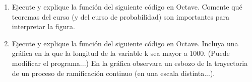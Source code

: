 \begin{problema}
\mbox{}
\begin{enumerate}
\item Ejecute y explique la funci\'on del siguiente c\'odigo en Octave. Comente qu\'e teoremas del curso (y del curso de probabilidad) son importantes para interpretar la figura.

\item Ejecute y explique la funci\'on del siguiente c\'odigo en Octave. Incluya una gr\'afica en la que la longitud de la variable k sea mayor a 1000. (Puede modificar el programa...) En la gr\'afica observara un esbozo de la trayectoria de un proceso de ramificaci\'on continuo (en una escala distinta...).

\end{enumerate}
\end{problema}
